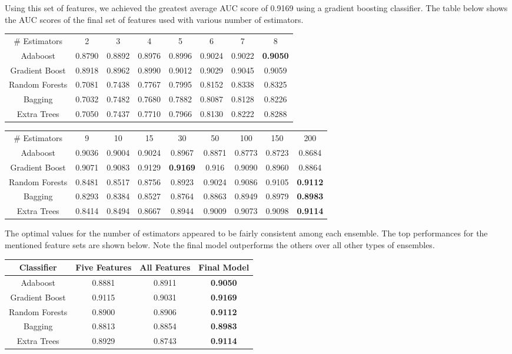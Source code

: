 \documentclass{article} %
\begin{document}
Using this set of features, we achieved the greatest average AUC score of
0.9169 using a gradient boosting classifier. The table below shows the AUC scores of the final set of features used with various number of estimators.

\begin{adjustbox}{width=\textwidth,totalheight=\textheight,keepaspectratio}
\begin{tabular}{c | c c c c c c c}
\# Estimators & 2 & 3 & 4 & 5 & 6 & 7 & 8\\
Adaboost & 0.8790 & 0.8892 & 0.8976 & 0.8996 & 0.9024 & 0.9022 & \textbf{0.9050}\\
\hline
Gradient Boost & 0.8918 & 0.8962 & 0.8990 & 0.9012 & 0.9029 & 0.9045 & 0.9059\\
Random Forests & 0.7081 & 0.7438 & 0.7767 & 0.7995 & 0.8152 & 0.8338 & 0.8325\\
Bagging & 0.7032 & 0.7482 & 0.7680 & 0.7882 & 0.8087 & 0.8128 & 0.8226\\
Extra Trees & 0.7050 & 0.7437 & 0.7710 & 0.7966 & 0.8130 & 0.8222 & 0.8288
\end{tabular}
\end{adjustbox}
\begin{adjustbox}{width=\textwidth,totalheight=\textheight,keepaspectratio}
\begin{tabular}{c | c c c c c c c c}
\# Estimators & 9 & 10 & 15 & 30 & 50 & 100 & 150 & 200\\
Adaboost & 0.9036 & 0.9004 & 0.9024 & 0.8967 & 0.8871 & 0.8773 & 0.8723 & 0.8684\\
\hline
Gradient Boost & 0.9071 & 0.9083 & 0.9129 & \textbf{0.9169} & 0.916 & 0.9090 & 0.8960 & 0.8864\\
Random Forests & 0.8481 & 0.8517 & 0.8756 & 0.8923 & 0.9024 & 0.9086 & 0.9105 & \textbf{0.9112}\\
Bagging & 0.8293 & 0.8384 & 0.8527 & 0.8764 & 0.8863 & 0.8949 & 0.8979 & \textbf{0.8983}\\
Extra Trees & 0.8414 & 0.8494 & 0.8667 & 0.8944 & 0.9009 & 0.9073 & 0.9098 & \textbf{0.9114}
\end{tabular}
\end{adjustbox}

The optimal values for the number of estimators appeared to be fairly consistent
among each ensemble. The top performances for the mentioned feature sets are
shown below. Note the final model outperforms the others over all other types of
ensembles.

\begin{tabular}{c|ccc}
Classifier & Five Features & All Features & Final Model\\
\hline
Adaboost & 0.8881 & 0.8911 & \textbf{0.9050}\\
Gradient Boost & 0.9115 & 0.9031 & \textbf{0.9169}\\
Random Forests & 0.8900 & 0.8906 & \textbf{0.9112}\\
Bagging & 0.8813 & 0.8854 & \textbf{0.8983}\\
Extra Trees & 0.8929 & 0.8743 & \textbf{0.9114}
\end{tabular}
\end{document}
